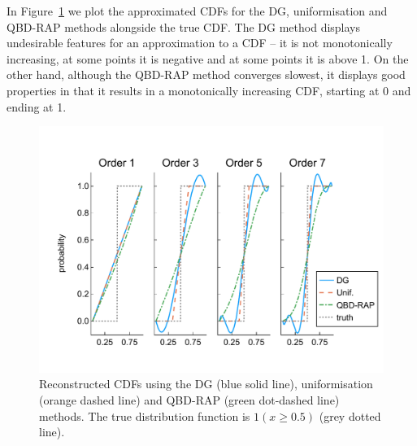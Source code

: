 \begin{example}
In Figure~\ref{fig: pdf comp fun 1} we plot the approximated CDFs for the DG, uniformisation and QBD-RAP methods alongside the true CDF. The DG method displays undesirable features for an approximation to a CDF -- it is not monotonically increasing, at some points it is negative and at some points it is above 1. On the other hand, although the QBD-RAP method converges slowest, it displays good properties in that it results in a monotonically increasing CDF, starting at 0 and ending at 1. 
\begin{figure}
	\centering
	\includegraphics[width=\textwidth]{chapter6/figs/comp/fun1/cdfs_formatted.pdf}
	\caption{Reconstructed CDFs using the DG (blue solid line), uniformisation (orange dashed line) and QBD-RAP (green dot-dashed line) methods. The true distribution function is \(1(x\geq 0.5)\) (grey dotted line).}
	\label{fig: pdf comp fun 1}
\end{figure} 
\end{example}

